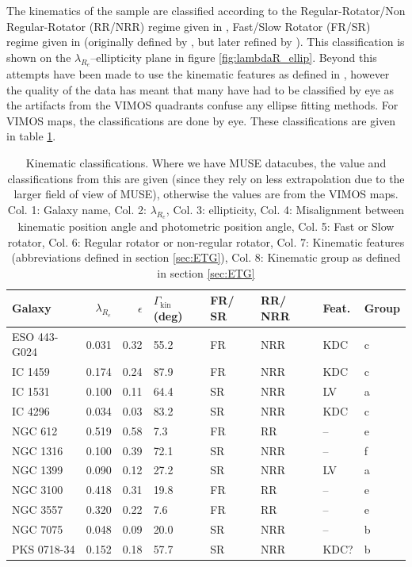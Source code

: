 		The kinematics of the sample are classified according to the Regular-Rotator/Non Regular-Rotator (RR/NRR) regime given in \citet{Krajnovic2011}, Fast/Slow Rotator (FR/SR) regime given in \citet{Cappellari2016} (originally defined by \citet{Emsellem2011}, but later refined by \citet{Cappellari2016}). This classification is shown on the $\lambda_{R_e}$--ellipticity plane in figure \ref{fig:lambdaR_ellip}. Beyond this attempts have been made to use the kinematic features as defined in \citet{Krajnovic2011}, however the quality of the data has meant that many have had to be classified by eye as the artifacts from the VIMOS quadrants confuse any ellipse fitting methods. For VIMOS maps, the classifications are done by eye. These classifications are given in table \ref{tab:classify}. 


		\begin{table}
			\centering
			\caption{Kinematic classifications. Where we have MUSE datacubes, the value and classifications from this are given (since they rely on less extrapolation due to the larger field of view of MUSE), otherwise the values are from the VIMOS maps. Col. 1: Galaxy name, Col. 2: $\lambda_{R_e}$, Col. 3: ellipticity, Col. 4: Misalignment between kinematic position angle and photometric position angle, Col. 5: Fast or Slow rotator, Col. 6: Regular rotator or non-regular rotator, Col. 7: Kinematic features (abbreviations defined in section \ref{sec:ETG}), Col. 8: Kinematic group as defined in section \ref{sec:ETG}}
			\label{tab:classify}
			\begin{tabular}{l r r p{0.7cm} p{0.8cm} p{0.8cm} p{1cm} p{1cm}}
				\hline
				\hline
				Galaxy		& $\lambda_{R_e}$ & $\epsilon$  & $\Gamma_\text{kin}$ (deg) & FR/ SR 	& RR/ NRR 	& Feat. & Group 	\\
				\hline 
				ESO 443-G024 & 0.031 & 0.32 & 55.2 	& FR & NRR & KDC & c \\
				IC 1459 	& 0.174 & 0.24 & 87.9	& FR & NRR & KDC & c \\
				IC 1531 	& 0.100 & 0.11 & 64.4 	& SR & NRR & LV & a \\
				IC 4296		& 0.034 & 0.03 & 83.2 	& SR & NRR & KDC & c \\
				NGC 612 	& 0.519 & 0.58 & 7.3 	& FR & RR & -- & e \\
				NGC 1316 	& 0.100 & 0.39 & 72.1 	& SR & NRR & -- & f \\
				NGC 1399 	& 0.090 & 0.12 & 27.2 	& SR & NRR & LV & a \\
				NGC 3100 	& 0.418 & 0.31 & 19.8 	& FR & RR & -- & e \\
				NGC 3557 	& 0.320 & 0.22 & 7.6 	& FR & RR & -- & e\\
				NGC 7075 	& 0.048 & 0.09 & 20.0 	& SR & NRR & -- & b \\
				PKS 0718-34 & 0.152 & 0.18 & 57.7 	& SR & NRR & KDC? & b\\
				\hline
				\hline
			\end{tabular}
		\end{table}

